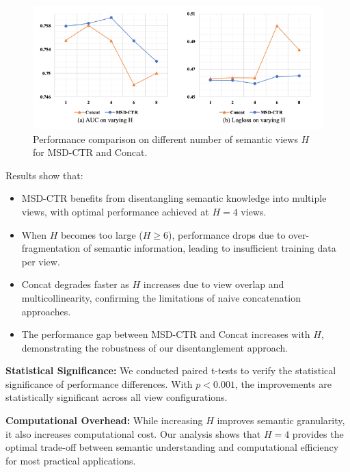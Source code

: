 \begin{figure}[htbp]
    \centering
    \includegraphics[width=\textwidth]{Figures/Chapter5/fig4.png}
    \caption{Performance comparison on different number of semantic views $H$ for MSD-CTR and Concat.}
    \label{fig:view-ablation}
\end{figure}

Results show that:
\begin{itemize}
    \item MSD-CTR benefits from disentangling semantic knowledge into multiple views, with optimal performance achieved at $H=4$ views.
    \item When $H$ becomes too large ($H \geq 6$), performance drops due to over-fragmentation of semantic information, leading to insufficient training data per view.
    \item Concat degrades faster as $H$ increases due to view overlap and multicollinearity, confirming the limitations of naive concatenation approaches.
    \item The performance gap between MSD-CTR and Concat increases with $H$, demonstrating the robustness of our disentanglement approach.
\end{itemize}

\textbf{Statistical Significance:} We conducted paired t-tests to verify the statistical significance of performance differences. With $p < 0.001$, the improvements are statistically significant across all view configurations.

\textbf{Computational Overhead:} While increasing $H$ improves semantic granularity, it also increases computational cost. Our analysis shows that $H=4$ provides the optimal trade-off between semantic understanding and computational efficiency for most practical applications.